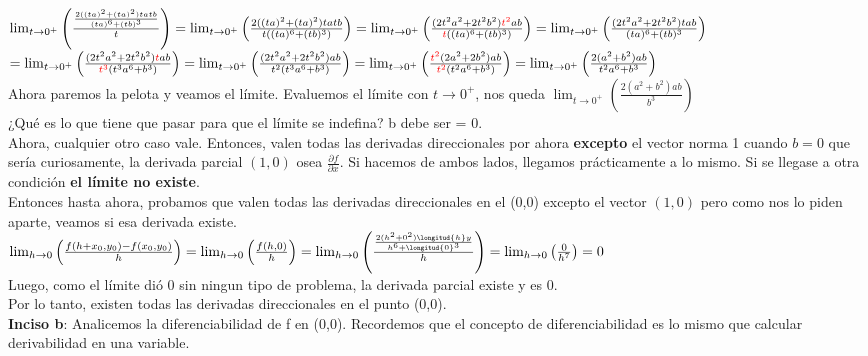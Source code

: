 \documentclass[10pt,a4paper]{article}
\begin{document}
$\lim_{t \to 0^{+}} \left(\frac{\frac{2((ta)^{2} + (ta)^{2}) ta tb}{(ta)^{6} + (tb)^{3}}}{t} \right) = \lim_{t \to 0^{+}} \left(\frac{2((ta)^{2} + (ta)^{2}) ta tb}{t((ta)^{6} + (tb)^{3})} \right) = \lim_{t \to 0^{+}} \left(\frac{(2t^{2}a^{2} + 2t^{2}b^{2}) \textcolor{red}{t^{2}}ab}{\textcolor{red}{t}((ta)^{6} + (tb)^{3})} \right) = \lim_{t \to 0^{+}} \left(\frac{(2t^{2}a^{2} + 2t^{2}b^{2}) tab}{(ta)^{6} + (tb)^{3}} \right) $ \\
$= \lim_{t \to 0^{+}} \left(\frac{(2t^{2}a^{2} + 2t^{2}b^{2}) \textcolor{red}{t}ab}{\textcolor{red}{t^{3}}(t^{3}a^{6} + b^{3})} \right) = \lim_{t \to 0^{+}} \left(\frac{(2t^{2}a^{2} + 2t^{2}b^{2})ab}{t^{2}(t^{3}a^{6} + b^{3})} \right) = \lim_{t \to 0^{+}} \left(\frac{\textcolor{red}{t^{2}}(2a^{2} + 2b^{2})ab}{\textcolor{red}{t^{2}}(t^{2}a^{6} + b^{3})} \right) = \lim_{t \to 0^{+}} \left(\frac{2(a^{2} + b^{2})ab}{t^{2}a^{6} + b^{3}} \right)$  \\
Ahora paremos la pelota y veamos el límite. Evaluemos el límite con $t \rightarrow 0^{+}$, nos queda $\lim_{t \to 0^{+}} \left(\frac{2(a^{2} + b^{2})ab}{b^{3}} \right)$ \\
¿Qué es lo que tiene que pasar para que el límite se indefina? b debe ser = 0. \\
Ahora, cualquier otro caso vale. Entonces, valen todas las derivadas direccionales por ahora \textbf{excepto} el vector norma 1 cuando $b=0$ que sería curiosamente, la derivada parcial $(1,0)$ osea $\frac{\partial f}{\partial x}$. 
Si hacemos de ambos lados, llegamos prácticamente a lo mismo. Si se llegase a otra condición \textbf{el límite no existe}. \\
Entonces hasta ahora, probamos que valen todas las derivadas direccionales en el (0,0) excepto el vector $(1,0)$ pero como nos lo piden aparte, veamos si esa derivada existe. \\
$\lim_{h \to 0} \left(\frac{f(h + x_{0}, y_{0}) - f(x_{0}, y_{0})}{h} \right) = \lim_{h \to 0} \left(\frac{f(h, 0)}{h} \right) = \lim_{h \to 0} \left(\frac{\frac{2(h^{2} + 0^{2}) \longitud{h} y}{h^{6} + \longitud{0}^{3}}}{h} \right) = \lim_{h \to 0} \left(\frac{0}{h^{7}} \right) = 0  $ \\
Luego, como el límite dió 0 sin ningun tipo de problema, la derivada parcial existe y es 0. \\
Por lo tanto, existen todas las derivadas direccionales en el punto (0,0). \\
\textbf{Inciso b}: Analicemos la diferenciabilidad de f en (0,0). Recordemos que el concepto de diferenciabilidad es lo mismo que calcular derivabilidad en una variable. \\
\end{document}
